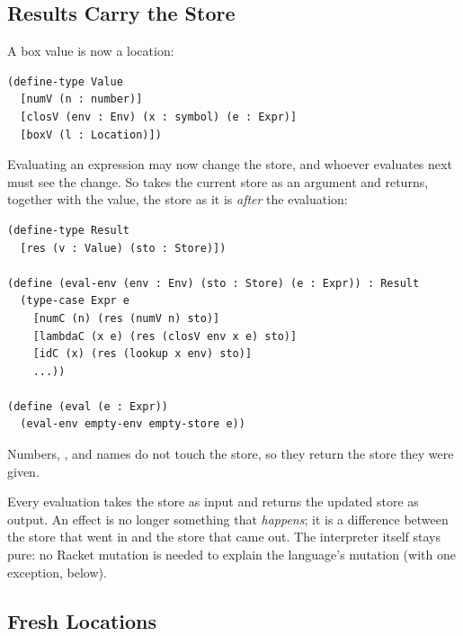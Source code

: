 \subsection{Results Carry the Store}

A box value is now a location:
\begin{lstlisting}
(define-type Value
  [numV (n : number)]
  [closV (env : Env) (x : symbol) (e : Expr)]
  [boxV (l : Location)])
\end{lstlisting}
Evaluating an expression may now change the store, and whoever evaluates next must see the change. So  takes the current store as an argument and returns, together with the value, the store as it is \emph{after} the evaluation:
\begin{lstlisting}
(define-type Result
  [res (v : Value) (sto : Store)])

(define (eval-env (env : Env) (sto : Store) (e : Expr)) : Result
  (type-case Expr e
    [numC (n) (res (numV n) sto)]
    [lambdaC (x e) (res (closV env x e) sto)]
    [idC (x) (res (lookup x env) sto)]
    ...))

(define (eval (e : Expr))
  (eval-env empty-env empty-store e))
\end{lstlisting}
Numbers, , and names do not touch the store, so they return the store they were given.

\begin{keypoint}
Every evaluation takes the store as input and returns the updated store as output. An effect is no longer something that \emph{happens}; it is a difference between the store that went in and the store that came out. The interpreter itself stays pure: no Racket mutation is needed to explain the language's mutation (with one exception,  below).
\end{keypoint}

\subsection{Fresh Locations}

